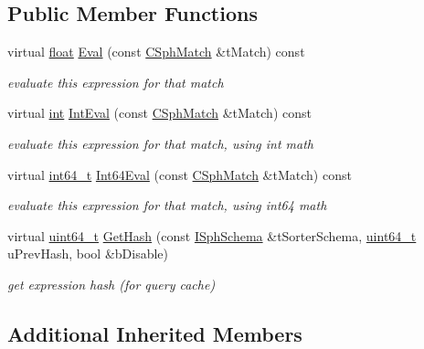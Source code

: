 \subsection*{Public Member Functions}
\begin{DoxyCompactItemize}
\item 
virtual \hyperlink{sphinxexpr_8cpp_a0e0d0739f7035f18f949c2db2c6759ec}{float} \hyperlink{structExpr__GetWeight__c_afd2398a1e9f3d94447d5f01b3b0460f2}{Eval} (const \hyperlink{classCSphMatch}{C\-Sph\-Match} \&t\-Match) const 
\begin{DoxyCompactList}\small\item\em evaluate this expression for that match \end{DoxyCompactList}\item 
virtual \hyperlink{sphinxexpr_8cpp_a4a26e8f9cb8b736e0c4cbf4d16de985e}{int} \hyperlink{structExpr__GetWeight__c_ac69fa513e941f704200581f9edfca193}{Int\-Eval} (const \hyperlink{classCSphMatch}{C\-Sph\-Match} \&t\-Match) const 
\begin{DoxyCompactList}\small\item\em evaluate this expression for that match, using int math \end{DoxyCompactList}\item 
virtual \hyperlink{sphinxstd_8h_a996e72f71b11a5bb8b3b7b6936b1516d}{int64\-\_\-t} \hyperlink{structExpr__GetWeight__c_a096b8536bf9a8f05fb645c615693e603}{Int64\-Eval} (const \hyperlink{classCSphMatch}{C\-Sph\-Match} \&t\-Match) const 
\begin{DoxyCompactList}\small\item\em evaluate this expression for that match, using int64 math \end{DoxyCompactList}\item 
virtual \hyperlink{sphinxstd_8h_aaa5d1cd013383c889537491c3cfd9aad}{uint64\-\_\-t} \hyperlink{structExpr__GetWeight__c_a344ded08f5b83f83dc4308d4bf2935a5}{Get\-Hash} (const \hyperlink{classISphSchema}{I\-Sph\-Schema} \&t\-Sorter\-Schema, \hyperlink{sphinxstd_8h_aaa5d1cd013383c889537491c3cfd9aad}{uint64\-\_\-t} u\-Prev\-Hash, bool \&b\-Disable)
\begin{DoxyCompactList}\small\item\em get expression hash (for query cache) \end{DoxyCompactList}\end{DoxyCompactItemize}
\subsection*{Additional Inherited Members}


